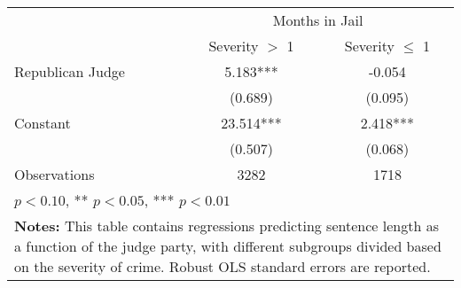 \begin{tabular}{l*{2}{c}}
\hline\hline
                    &\multicolumn{2}{c}{Months in Jail}\\
                    &\multicolumn{1}{c}{Severity $>$ 1}&\multicolumn{1}{c}{Severity $\le$ 1}\\
\hline
Republican Judge    &       5.183***&      -0.054         \\
                    &     (0.689)         &     (0.095)         \\
[1em]
Constant            &      23.514***&       2.418***\\
                    &     (0.507)         &     (0.068)         \\
\hline
Observations        &        3282         &        1718         \\
\hline\hline
\multicolumn{3}{l}{\footnotesize * \(p<0.10\), ** \(p<0.05\), *** \(p<0.01\)}\\
\multicolumn{3}{p{0.6\linewidth}}{\small \textbf{Notes:} This table contains regressions predicting sentence length as a function of the judge party, with different subgroups divided based on the severity of crime. Robust OLS standard errors are reported.} \\
\end{tabular}


